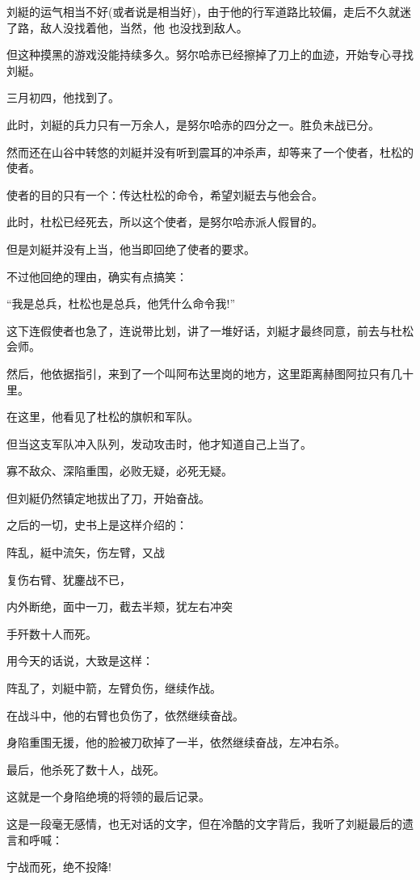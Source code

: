 \documentclass[11pt,a4paper,onecolumn]{article}
\begin{document}
刘綎的运气相当不好(或者说是相当好)，由于他的行军道路比较偏，走后不久就迷了路，敌人没找着他，当然，他
也没找到敌人。

但这种摸黑的游戏没能持续多久。努尔哈赤已经擦掉了刀上的血迹，开始专心寻找刘綎。

三月初四，他找到了。

此时，刘綎的兵力只有一万余人，是努尔哈赤的四分之一。胜负未战已分。

然而还在山谷中转悠的刘綎并没有听到震耳的冲杀声，却等来了一个使者，杜松的使者。

使者的目的只有一个：传达杜松的命令，希望刘綎去与他会合。

此时，杜松已经死去，所以这个使者，是努尔哈赤派人假冒的。

但是刘綎并没有上当，他当即回绝了使者的要求。

不过他回绝的理由，确实有点搞笑：

``我是总兵，杜松也是总兵，他凭什么命令我!''

这下连假使者也急了，连说带比划，讲了一堆好话，刘綎才最终同意，前去与杜松会师。

然后，他依据指引，来到了一个叫阿布达里岗的地方，这里距离赫图阿拉只有几十里。

在这里，他看见了杜松的旗帜和军队。

但当这支军队冲入队列，发动攻击时，他才知道自己上当了。

寡不敌众、深陷重围，必败无疑，必死无疑。

但刘綎仍然镇定地拔出了刀，开始奋战。

之后的一切，史书上是这样介绍的：

阵乱，綎中流矢，伤左臂，又战

复伤右臂、犹鏖战不已，

内外断绝，面中一刀，截去半颊，犹左右冲突

手歼数十人而死。

用今天的话说，大致是这样：

阵乱了，刘綎中箭，左臂负伤，继续作战。

在战斗中，他的右臂也负伤了，依然继续奋战。

身陷重围无援，他的脸被刀砍掉了一半，依然继续奋战，左冲右杀。

最后，他杀死了数十人，战死。

这就是一个身陷绝境的将领的最后记录。

这是一段毫无感情，也无对话的文字，但在冷酷的文字背后，我听了刘綎最后的遗言和呼喊：

宁战而死，绝不投降!

\section[\thesection]{}
\end{document}
